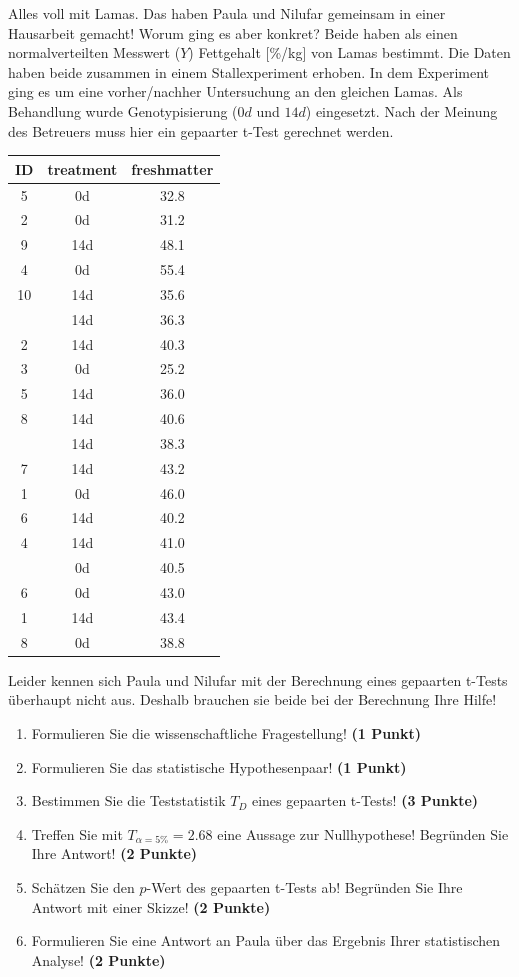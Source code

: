 \documentclass[a4paper, 9pt]{scrartcl}\usepackage[]{graphicx}\usepackage[]{xcolor}
\begin{document}
Alles voll mit Lamas. Das haben Paula und Nilufar gemeinsam in einer Hausarbeit gemacht! Worum ging es aber konkret? Beide haben als einen normalverteilten Messwert ($Y$) Fettgehalt [\%/kg] von Lamas bestimmt. Die Daten haben beide zusammen in einem Stallexperiment erhoben. In dem Experiment ging es um eine vorher/nachher Untersuchung an den gleichen Lamas. Als Behandlung wurde Genotypisierung ($0d$ und $14d$) eingesetzt. Nach der Meinung des Betreuers muss hier ein gepaarter t-Test gerechnet werden.

\begin{table}[!h]
\centering
\begin{tabular}{ccc}
\toprule
ID & treatment & freshmatter\\
\midrule
5 & 0d & 32.8\\
2 & 0d & 31.2\\
9 & 14d & 48.1\\
4 & 0d & 55.4\\
10 & 14d & 35.6\\
\addlinespace
11 & 14d & 36.3\\
2 & 14d & 40.3\\
3 & 0d & 25.2\\
5 & 14d & 36.0\\
8 & 14d & 40.6\\
\addlinespace
3 & 14d & 38.3\\
7 & 14d & 43.2\\
1 & 0d & 46.0\\
6 & 14d & 40.2\\
4 & 14d & 41.0\\
\addlinespace
7 & 0d & 40.5\\
6 & 0d & 43.0\\
1 & 14d & 43.4\\
8 & 0d & 38.8\\
\bottomrule
\end{tabular}
\end{table}



Leider kennen sich Paula und Nilufar mit der Berechnung eines gepaarten t-Tests überhaupt nicht aus. Deshalb brauchen sie beide bei der Berechnung Ihre Hilfe!

\begin{enumerate}
  \item Formulieren Sie die wissenschaftliche Fragestellung! \textbf{(1 Punkt)}
  \item Formulieren Sie das statistische Hypothesenpaar! \textbf{(1 Punkt)}
  \item Bestimmen Sie die Teststatistik $T_{D}$ eines gepaarten t-Tests! \textbf{(3 Punkte)}
  \item Treffen Sie mit $T_{\alpha = 5\%} = 2.68$ eine Aussage zur Nullhypothese! Begründen Sie Ihre Antwort! \textbf{(2 Punkte)}
\item Schätzen Sie den $p$-Wert des gepaarten t-Tests ab! Begründen Sie Ihre Antwort mit einer Skizze! \textbf{(2 Punkte)}
\item Formulieren Sie eine Antwort an Paula über das Ergebnis Ihrer statistischen Analyse! \textbf{(2 Punkte)}
\end{enumerate}
\end{document}
